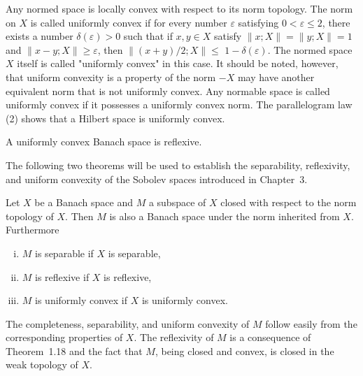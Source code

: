 \begin{para}
  Any normed space is locally convex with respect to its norm topology.
  The norm on $X$ is called uniformly convex if for every number $\varepsilon$ 
  satisfying $0<\varepsilon \leq 2$, there exists a number $\delta(\varepsilon)>0$ such 
  that if $x, y \in X$ satisfy $\|x ; X\|=\|y ; X\|=1$ and $\|x-y ; X\| \geq \varepsilon$, then $\|(x+y) / 2 ; X\| \leq$ $1-\delta(\varepsilon)$.
  The normed space $X$ itself is called "uniformly convex" in this case.
  It should be noted, however, that uniform convexity is a property of the norm $-X$ 
  may have another equivalent norm that is not uniformly convex. Any normable space 
  is called uniformly convex if it possesses a uniformly convex norm.
  The parallelogram law (2) shows that a Hilbert space is uniformly convex.
\end{para}

\begin{theorem}
  A uniformly convex Banach space is reflexive.
\end{theorem}

The following two theorems will be used to establish the separability, reflexivity, and uniform convexity of the Sobolev spaces introduced in Chapter~3.


\begin{theorem}
  Let $X$ be a Banach space and $M$ a subspace of $X$ closed with respect to the norm 
  topology of $X$. Then $M$ is also a Banach space under the norm inherited from $X$. 
  Furthermore
  \begin{enumerate}[(i)]
    \item $M$ is separable if $X$ is separable,
    \item $M$ is reflexive if $X$ is reflexive,
    \item $M$ is uniformly convex if $X$ is uniformly convex.
  \end{enumerate}
\end{theorem}

The completeness, separability, and uniform convexity of $M$ follow easily from the corresponding properties of $X$. The reflexivity of $M$ is a consequence of Theorem~1.18 and the fact that $M$, being closed and convex, is closed in the weak topology of $X$.


